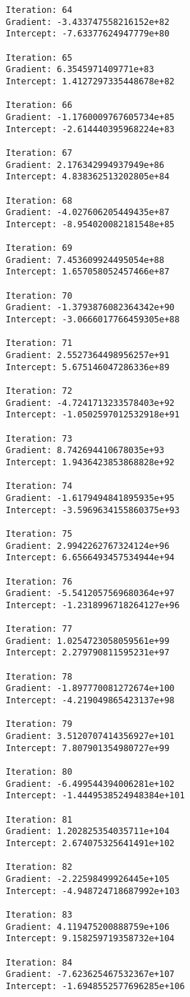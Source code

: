\documentclass[11pt]{article}
\begin{document}
\begin{Verbatim}[commandchars=\\\{\}]
Iteration: 64 
Gradient: -3.433747558216152e+82 
Intercept: -7.63377624947779e+80 

Iteration: 65 
Gradient: 6.3545971409771e+83 
Intercept: 1.4127297335448678e+82 

Iteration: 66 
Gradient: -1.1760009767605734e+85 
Intercept: -2.614440395968224e+83 

Iteration: 67 
Gradient: 2.176342994937949e+86 
Intercept: 4.838362513202805e+84 

Iteration: 68 
Gradient: -4.027606205449435e+87 
Intercept: -8.954020082181548e+85 

Iteration: 69 
Gradient: 7.453609924495054e+88 
Intercept: 1.657058052457466e+87 

Iteration: 70 
Gradient: -1.3793876082364342e+90 
Intercept: -3.0666017766459305e+88 

Iteration: 71 
Gradient: 2.5527364498956257e+91 
Intercept: 5.675146047286336e+89 

Iteration: 72 
Gradient: -4.7241713233578403e+92 
Intercept: -1.0502597012532918e+91 

Iteration: 73 
Gradient: 8.742694410678035e+93 
Intercept: 1.9436423853868828e+92 

Iteration: 74 
Gradient: -1.6179494841895935e+95 
Intercept: -3.5969634155860375e+93 

Iteration: 75 
Gradient: 2.9942262767324124e+96 
Intercept: 6.6566493457534944e+94 

Iteration: 76 
Gradient: -5.5412057569680364e+97 
Intercept: -1.2318996718264127e+96 

Iteration: 77 
Gradient: 1.0254723058059561e+99 
Intercept: 2.279790811595231e+97 

Iteration: 78 
Gradient: -1.897770081272674e+100 
Intercept: -4.219049865423137e+98 

Iteration: 79 
Gradient: 3.5120707414356927e+101 
Intercept: 7.807901354980727e+99 

Iteration: 80 
Gradient: -6.499544394006281e+102 
Intercept: -1.4449538524948384e+101 

Iteration: 81 
Gradient: 1.202825354035711e+104 
Intercept: 2.674075325641491e+102 

Iteration: 82 
Gradient: -2.22598499926445e+105 
Intercept: -4.948724718687992e+103 

Iteration: 83 
Gradient: 4.119475200888759e+106 
Intercept: 9.158259719358732e+104 

Iteration: 84 
Gradient: -7.623625467532367e+107 
Intercept: -1.6948552577696285e+106 


\end{Verbatim}
\end{document}
